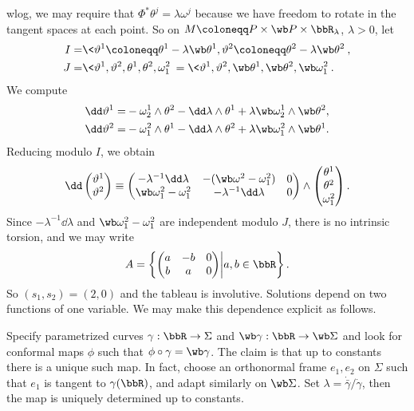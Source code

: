 \begin{example}
    \gls{wlog}, we may require that $\Phi^\ast\theta^j=\lambda\omega^j$ because we have freedom to rotate in the tangent spaces at each point. So on $M\coloneqq P\times \wb P\times \bbR_\lambda$, $\lambda>0$, let 
    \begin{align}
        I=&\<\vartheta^1\coloneqq \theta^1-\lambda\wb\theta^1,\vartheta^2\coloneqq \theta^2-\lambda\wb\theta^2\>,\\
        J=&\<\vartheta^1,\vartheta^2,\theta^1,\theta^2,\omega^2_1\>=\<\vartheta^1,\vartheta^2,\wb\theta^1,\wb\theta^2,\wb\omega^2_1\>.
    \end{align}
    We compute 
    \begin{align}
        \dd \vartheta^1 =& -\omega^1_2\wedge \theta^2-\dd\lambda\wedge\theta^1+\lambda\wb\omega^1_2\wedge\wb\theta^2,\\
        \dd\vartheta^2=&-\omega^2_1\wedge\theta^1-\dd\lambda\wedge\theta^2+\lambda\wb\omega^2_1\wedge \wb\theta^1.
    \end{align}
    Reducing modulo $I$, we obtain 
    \[\dd\begin{pmatrix}
        \vartheta^1\\
        \vartheta^2
    \end{pmatrix}
    \equiv 
    \begin{pmatrix}
        -\lambda^{-1}\dd\lambda & -(\wb\omega^2-\omega^2_1) & 0\\
        \wb\omega^2_1 -\omega^2_1 & -\lambda^{-1}\dd\lambda & 0
    \end{pmatrix}
    \wedge 
    \begin{pmatrix}
        \theta^1\\\theta^2\\\omega^2_1
    \end{pmatrix}.
    \]
    Since $-\lambda^{-1}\dd\lambda$ and $\wb\omega^2_1-\omega^2_1$ are independent modulo $J$, there is no intrinsic torsion, and we may write 
    \[A=\left\{
        \begin{pmatrix}
            a & -b & 0\\
            b & a & 0
        \end{pmatrix}
        \middle| a,b\in\bbR
    \right\}.\]
    So $(s_1,s_2)=(2,0)$ and the tableau is involutive. Solutions depend on two functions of one variable. We may make this dependence explicit as follows.

    Specify parametrized curves $\gamma:\bbR\to \Sigma$ and $\wb\gamma:\bbR\to \wb\Sigma$ and look for conformal maps $\phi$ such that $\phi\circ \gamma=\wb\gamma$. The claim is that up to constants there is a unique such map. In fact, choose an orthonormal frame $e_1,e_2$ on $\Sigma$ such that $e_1$ is tangent to $\gamma(\bbR)$, and adapt similarly on $\wb\Sigma$. Set $\lambda=\dot{\bar\gamma}/\dot\gamma$, then the map is uniquely determined up to constants.


\end{example}
